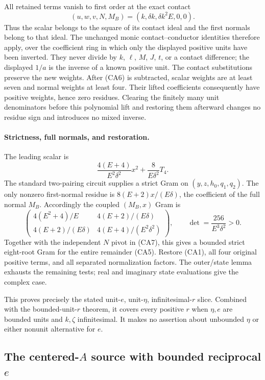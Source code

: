 All retained terms vanish to first order at the exact contact
\[ (u,w,v,N,M_B)=(k,\delta k,\delta k^2E,0,0). \]
Thus the scalar belongs to the square of its contact ideal and the
first normals belong to that ideal. The unchanged monic
contact--conductor identities therefore apply, over the coefficient
ring in which only the displayed positive units have been inverted.
They never divide by $k$, $\ell$, $M$, $J$, $t$, or a contact difference;
the displayed $1/a$ is the inverse of a known positive unit.
The contact substitutions preserve the new weights. After (CA6) is
subtracted, scalar weights are at least seven and normal weights at
least four. Their lifted coefficients consequently have positive
weights, hence zero residues. Clearing the finitely many unit
denominators before this polynomial lift and restoring them afterward
changes no residue sign and introduces no mixed inverse.

\paragraph{Strictness, full normals, and restoration.}
The leading scalar is
\[
 \frac{4(E+4)}{E^2\delta^2}x^2+\frac8{E\delta^2}T_4.
\]
The standard two-pairing circuit supplies a strict Gram on
$(y,z,h_0,q_1,q_2)$. The only nonzero first-normal residue is
$8(E+2)x/(E\delta)$, the coefficient of the full normal $M_B$.
Accordingly the coupled $(M_B,x)$ Gram is
\[
 \begin{pmatrix}
 4(E^2+4)/E&4(E+2)/(E\delta)\\
 4(E+2)/(E\delta)&4(E+4)/(E^2\delta^2)
 \end{pmatrix},\qquad
 \det=\frac{256}{E^3\delta^2}>0.                      \tag{CA8}
\]
Together with the independent $N$ pivot in (CA7), this gives a
bounded strict eight-root Gram for the entire remainder (CA5).
Restore (CA1), all four original positive terms, and all separated
normalization factors. The outer/state lemma exhausts the remaining
tests; real and imaginary state evaluations give the complex case.

This proves precisely the stated unit-$e$, unit-$\eta$,
infinitesimal-$r$ slice. Combined with the bounded-unit-$r$ theorem,
it covers every positive $r$ when $\eta,e$ are bounded units and
$k,\zeta$ infinitesimal. It makes no assertion about unbounded
$\eta$ or either nonunit alternative for $e$.



\subsection{The centered-$A$ source with bounded reciprocal $e$}

